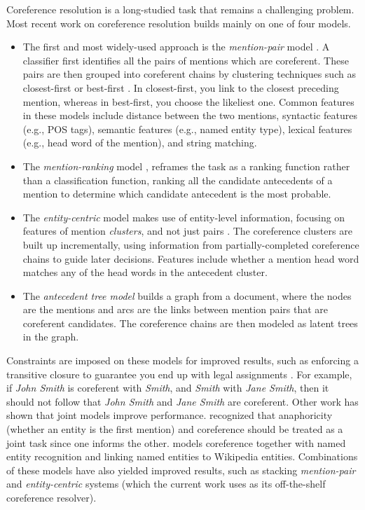 Coreference resolution is a long-studied task that remains a challenging problem. Most recent work on coreference resolution builds mainly on one of four models. 
\begin{itemize}
\item The first and most widely-used approach is the \textit{mention-pair} model \cite{Soon:2001,Ng:2002}. A classifier first identifies all the pairs of mentions which are coreferent. These pairs are then grouped into coreferent chains by clustering techniques such as closest-first \cite{Soon:2001} or best-first \cite{Ng:2002,Ng:2002b}. In closest-first, you link to the closest preceding mention, whereas in best-first, you choose the likeliest one. Common features in these models include distance between the two mentions, syntactic features (e.g.,  POS tags), semantic features (e.g., named entity type), lexical features (e.g., head word of the mention), and string matching.
\item  The \textit{mention-ranking} model \cite{Denis:2008}, reframes the task as a ranking function rather than a classification function, ranking all the candidate antecedents of a mention to determine which candidate antecedent is the most probable.
\item The \textit{entity-centric} model makes use of entity-level information, focusing on features of mention \textit{clusters}, and not just pairs \cite{Raghunathan:2010}. The coreference clusters are built up incrementally, using information from  partially-completed coreference chains to guide later decisions. Features include whether a mention head word matches any of the head words in the antecedent cluster.
 \item The \textit{antecedent tree model} \cite{Yu:2009} builds a graph from a document, where the nodes are the mentions and arcs are the links between mention pairs that are coreferent candidates. The coreference chains are then modeled as latent trees in the graph.
\end{itemize}
Constraints are imposed on these models for improved results, such as enforcing a transitive closure to guarantee you end up with legal assignments \cite{Finkel:2008}. For example, if \textit{John Smith} is coreferent with \textit{Smith}, and \textit{Smith} with \textit{Jane Smith}, then it should not follow that \textit{John Smith} and \textit{Jane Smith} are coreferent. Other work has shown that joint models improve performance.  recognized that anaphoricity (whether an entity is the first mention) and coreference should be treated as a joint task since one informs the other.  models coreference together with named entity recognition and linking named entities to Wikipedia entities. Combinations of these models have also yielded improved results, such as  stacking \textit{mention-pair} and \textit{entity-centric} systems (which the current work uses as its off-the-shelf coreference resolver).

